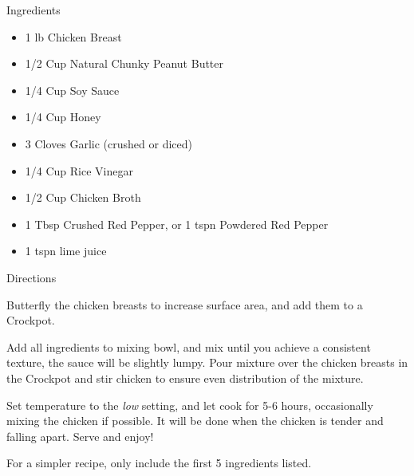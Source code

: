Ingredients
\begin{itemize}
	\item 1 lb Chicken Breast
	\item 1/2 Cup Natural Chunky Peanut Butter
	\item 1/4 Cup Soy Sauce
	\item 1/4 Cup Honey
	\item 3 Cloves Garlic (crushed or diced)
	\item 1/4 Cup Rice Vinegar
	\item 1/2 Cup Chicken Broth
	\item 1 Tbsp Crushed Red Pepper, or 1 tspn Powdered Red Pepper
	\item 1 tspn lime juice
\end{itemize}

\noindent
Directions
\newline

Butterfly the chicken breasts to increase surface area, and add them to a Crockpot.

Add all ingredients to mixing bowl, and mix until you achieve a consistent texture, the sauce will be slightly lumpy. Pour mixture over the chicken breasts in the Crockpot and stir chicken to ensure even distribution of the mixture.

Set temperature to the \textit{low} setting, and let cook for 5-6 hours, occasionally mixing the chicken if possible. It will be done when the chicken is tender and falling apart. Serve and enjoy!

For a simpler recipe, only include the first 5 ingredients listed.